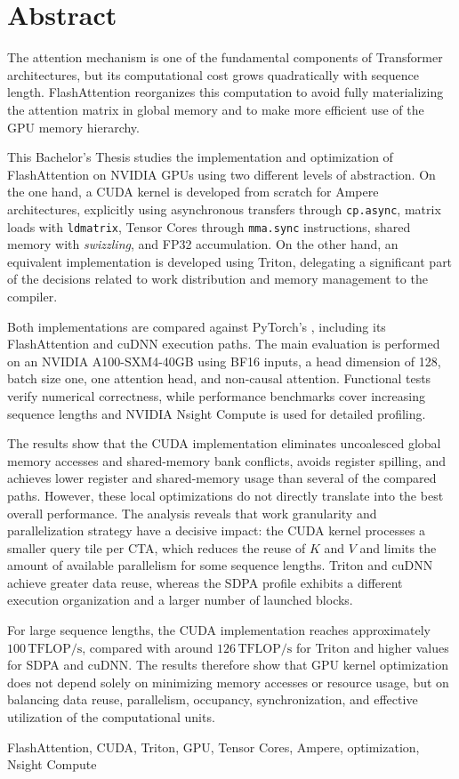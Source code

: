 \renewcommand{\keywords}[1]{\par\vspace{1em}{\itshape\bfseries Keywords -- }#1}

\chapter*{Abstract}

The attention mechanism is one of the fundamental components of Transformer architectures, but its computational cost grows quadratically with sequence length. FlashAttention reorganizes this computation to avoid fully materializing the attention matrix in global memory and to make more efficient use of the GPU memory hierarchy.

This Bachelor's Thesis studies the implementation and optimization of FlashAttention on NVIDIA GPUs using two different levels of abstraction. On the one hand, a CUDA kernel is developed from scratch for Ampere architectures, explicitly using asynchronous transfers through \texttt{cp.async}, matrix loads with \texttt{ldmatrix}, Tensor Cores through \texttt{mma.sync} instructions, shared memory with \textit{swizzling}, and FP32 accumulation. On the other hand, an equivalent implementation is developed using Triton, delegating a significant part of the decisions related to work distribution and memory management to the compiler.

Both implementations are compared against PyTorch's , including its FlashAttention and cuDNN execution paths. The main evaluation is performed on an NVIDIA A100-SXM4-40GB using BF16 inputs, a head dimension of 128, batch size one, one attention head, and non-causal attention. Functional tests verify numerical correctness, while performance benchmarks cover increasing sequence lengths and NVIDIA Nsight Compute is used for detailed profiling.

The results show that the CUDA implementation eliminates uncoalesced global memory accesses and shared-memory bank conflicts, avoids register spilling, and achieves lower register and shared-memory usage than several of the compared paths. However, these local optimizations do not directly translate into the best overall performance. The analysis reveals that work granularity and parallelization strategy have a decisive impact: the CUDA kernel processes a smaller query tile per CTA, which reduces the reuse of \(K\) and \(V\) and limits the amount of available parallelism for some sequence lengths. Triton and cuDNN achieve greater data reuse, whereas the SDPA profile exhibits a different execution organization and a larger number of launched blocks.

For large sequence lengths, the CUDA implementation reaches approximately \(100\,\text{TFLOP/s}\), compared with around \(126\,\text{TFLOP/s}\) for Triton and higher values for SDPA and cuDNN. The results therefore show that GPU kernel optimization does not depend solely on minimizing memory accesses or resource usage, but on balancing data reuse, parallelism, occupancy, synchronization, and effective utilization of the computational units.

\keywords{FlashAttention, CUDA, Triton, GPU, Tensor Cores, Ampere, optimization, Nsight Compute}
